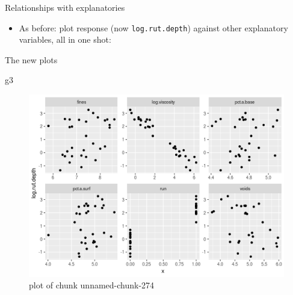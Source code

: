 \documentclass[ignorenonframetext,]{beamer}
\newenvironment{Shaded}{\begin{snugshade}}{\end{snugshade}}
\newcommand{\DataTypeTok}[1]{\textcolor[rgb]{0.13,0.29,0.53}{#1}}
\newcommand{\DecValTok}[1]{\textcolor[rgb]{0.00,0.00,0.81}{#1}}
\newcommand{\KeywordTok}[1]{\textcolor[rgb]{0.13,0.29,0.53}{\textbf{#1}}}
\newcommand{\NormalTok}[1]{#1}
\newcommand{\OperatorTok}[1]{\textcolor[rgb]{0.81,0.36,0.00}{\textbf{#1}}}
\newcommand{\StringTok}[1]{\textcolor[rgb]{0.31,0.60,0.02}{#1}}
\providecommand{\tightlist}{%
  \setlength{\itemsep}{0pt}\setlength{\parskip}{0pt}}
\begin{document}
\begin{frame}[fragile]{Relationships with explanatories}
\protect\hypertarget{relationships-with-explanatories}{}

\begin{itemize}
\tightlist
\item
  As before: plot response (now \texttt{log.rut.depth}) against other
  explanatory variables, all in one shot:
\end{itemize}

\begin{Shaded}
\end{Shaded}

\end{frame}

\begin{frame}[fragile]{The new plots}
\protect\hypertarget{the-new-plots}{}

\begin{Shaded}
\begin{Highlighting}[]
\NormalTok{g3}
\end{Highlighting}
\end{Shaded}

\begin{figure}
\centering
\includegraphics{figure/unnamed-chunk-274-1.png}
\caption{plot of chunk unnamed-chunk-274}
\end{figure}

\end{frame}
\end{document}
